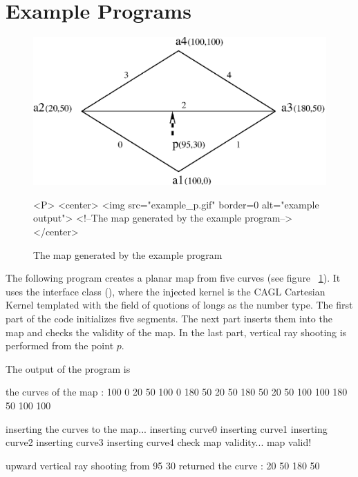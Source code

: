 \section{Example Programs}
\label{PM_sec:example}


\begin{figure}[h]
\begin{ccTexOnly}
    \centerline{
      \includegraphics{example_p.ps}
    }
\end{ccTexOnly}

\caption{The map generated by the example program
\label{PM_sec:example_pic}}

\begin{ccHtmlOnly}
    <P>
    <center>
        <img src="example_p.gif"  border=0 alt="example output">
        <!--The map generated by the example program-->
    </center>
\end{ccHtmlOnly}
\end{figure}

The following program creates a planar map from five curves (see figure
~\ref{PM_sec:example_pic}). It uses the interface class
(), where the injected kernel is the
CAGL Cartesian Kernel templated with the field of quotions of longs as the
number type.
The first part of the code initializes five segments. The next part inserts them
into the map and checks the validity of the map. In the last part, vertical ray
shooting is performed from the point $p$.


The output of the program is

\begin{ccExampleCode}
the curves of the map :
100 0 20 50
100 0 180 50
20 50 180 50
20 50 100 100
180 50 100 100

inserting the curves to the map...
inserting curve0
inserting curve1
inserting curve2
inserting curve3
inserting curve4
check map validity... map valid!

upward vertical ray shooting from 95 30
returned the curve : 20 50 180 50

\end{ccExampleCode}

